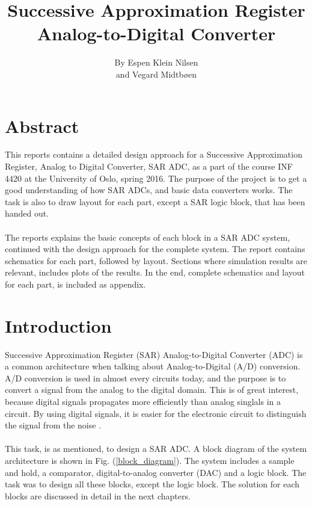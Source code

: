 \documentclass[english, 12pt, a4paper]{ifimaster}
\title{ \huge{Successive Approximation Register Analog-to-Digital Converter}}
\author{By Espen Klein Nilsen\\ and Vegard Midtbøen}
\begin{document}
\ififorside{}
 \frontmatter{}
\maketitle{} \newpage

\chapter*{Abstract}
This reports contains a detailed design approach for a Successive Approximation Register, Analog to
Digital Converter, SAR ADC, as a part of the course INF 4420 at the University of Oslo, spring 
2016. The purpose of the project is to get a good understanding of how SAR ADCs, and basic data 
converters works. The task is also to draw layout for each part, except a SAR logic block, that has
been handed out.\\
\\
The reports explains the basic concepts of each block in a SAR ADC system, continued with
the design approach for the complete system. The report contains schematics for each part, followed 
by layout. Sections where simulation results are relevant, includes plots of the results. In the 
end, complete schematics and layout for each part, is included as appendix. 

\tableofcontents{} \newpage
\listoffigures{} 
\listoftables{} \newpage


 \mainmatter{}        

\chapter{Introduction} 
Successive Approximation Register (SAR) Analog-to-Digital Converter (ADC) is a common architecture when talking about Analog-to-Digital (A/D) conversion. A/D conversion is used in almost every
circuits today, and the purpose is to convert a signal from the analog to the digital domain. This is of great interest, because digital signals propagates more efficiently than analog singlals in a 
circuit. By using digital signals, it is easier for the electronic circuit to distinguish the signal from the noise \cite{basic-adc}.\\
\\
This task, is as mentioned, to design a SAR ADC. A block diagram of the system architecture is shown in Fig. (\ref{block_diagram}). The system includes a sample and hold, a comparator, digital-to-analog 
converter (DAC) and a logic block. The task was to design all these blocks, except the logic block. The solution for each blocks are discussed in detail in the next chapters.  
\end{document}
